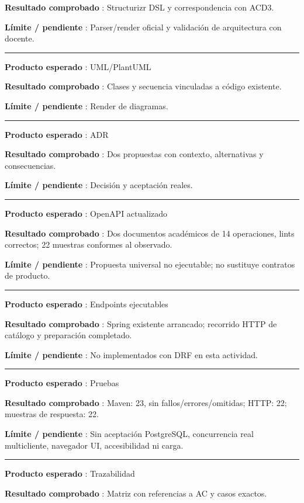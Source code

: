 \documentclass[11pt,a4paper]{article}
\begin{document}
\textbf{Resultado comprobado }: Structurizr DSL y correspondencia con
ACD3.

\textbf{Límite / pendiente }: Parser/render oficial y validación de
arquitectura con docente.

\medskip\hrule\medskip

\textbf{Producto esperado }: UML/PlantUML

\textbf{Resultado comprobado }: Clases y secuencia vinculadas a código
existente.

\textbf{Límite / pendiente }: Render de diagramas.

\medskip\hrule\medskip

\textbf{Producto esperado }: ADR

\textbf{Resultado comprobado }: Dos propuestas con contexto,
alternativas y consecuencias.

\textbf{Límite / pendiente }: Decisión y aceptación reales.

\medskip\hrule\medskip

\textbf{Producto esperado }: OpenAPI actualizado

\textbf{Resultado comprobado }: Dos documentos académicos de 14
operaciones, lints correctos; 22 muestras conformes al observado.

\textbf{Límite / pendiente }: Propuesta universal no ejecutable; no
sustituye contratos de producto.

\medskip\hrule\medskip

\textbf{Producto esperado }: Endpoints ejecutables

\textbf{Resultado comprobado }: Spring existente arrancado; recorrido
HTTP de catálogo y preparación completado.

\textbf{Límite / pendiente }: No implementados con DRF en esta
actividad.

\medskip\hrule\medskip

\textbf{Producto esperado }: Pruebas

\textbf{Resultado comprobado }: Maven: 23, sin fallos/errores/omitidas;
HTTP: 22; muestras de respuesta: 22.

\textbf{Límite / pendiente }: Sin aceptación PostgreSQL, concurrencia
real multicliente, navegador UI, accesibilidad ni carga.

\medskip\hrule\medskip

\textbf{Producto esperado }: Trazabilidad

\textbf{Resultado comprobado }: Matriz con referencias a AC y casos
exactos.
\end{document}
